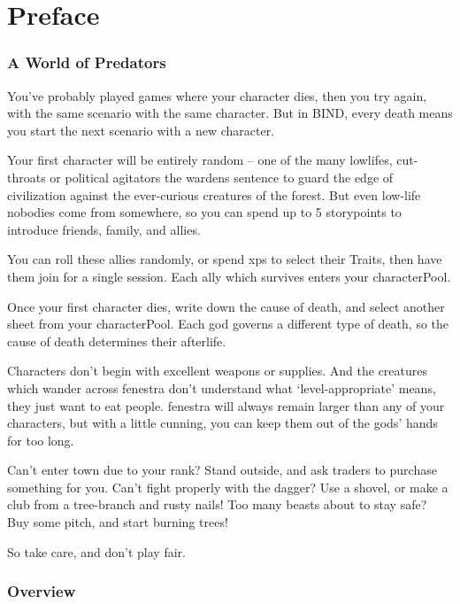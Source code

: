 \chapter{Preface}

\begin{multicols}{2}

\subsection*{A World of Predators}

You've probably played games where your character dies, then you try again, with the same scenario with the same character.
But in BIND, every death means you start the next scenario with a new character.

Your first character will be entirely random -- one of the many lowlifes, cut-throats or political agitators the \glspl{warden} sentence to guard the \gls{edge} of civilization against the ever-curious creatures of the forest.
But even low-life nobodies come from somewhere, so you can spend up to 5 \glspl{storypoint} to introduce friends, family, and allies.

You can roll these allies randomly, or spend \glspl{xp} to select their Traits, then have them join for a single session.
Each ally which survives enters your \gls{characterPool}.

Once your first character dies, write down the cause of death, and select another sheet from your \gls{characterPool}.
Each god governs a different type of death, so the cause of death determines their afterlife.

Characters don't begin with excellent weapons or supplies.
And the creatures which wander across \gls{fenestra} don't understand what `level-appropriate' means, they just want to eat people.
\Gls{fenestra} will always remain larger than any of your characters, but with a little cunning, you can keep them out of the gods' hands for too long.

Can't enter town due to your rank?
Stand outside, and ask traders to purchase something for you.
Can't fight properly with the dagger?
Use a shovel, or make a club from a tree-branch and rusty nails!
Too many beasts about to stay safe?
Buy some pitch, and start burning trees!

So take care, and don't play fair.

\subsection*{Overview}


\end{multicols}
